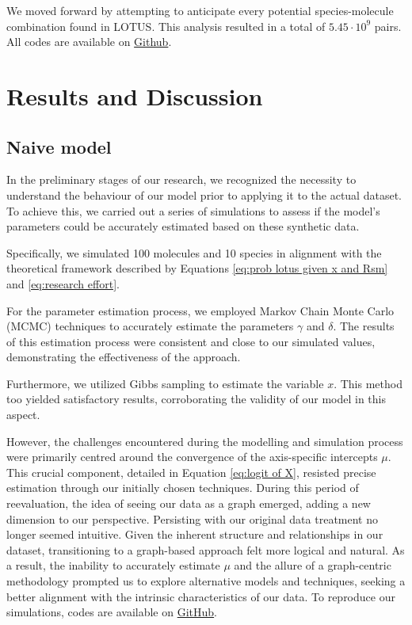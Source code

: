 \documentclass[
11pt, %
oneside, %
english, %
singlespacing, %
headsepline, %
chapterinoneline, %
]{MastersDoctoralThesis} %
\begin{document}
We moved forward by attempting to anticipate every potential species-molecule combination found in LOTUS. This analysis resulted in a total of $5.45 \cdot 10^9$ pairs. All codes are available on \href{https://github.com/anticipated-lotus/GNN}{Github}.


\chapter{Results and Discussion}
\section{Naive model}
In the preliminary stages of our research, we recognized the necessity to understand the behaviour of our model prior to applying it to the actual dataset. To achieve this, we carried out a series of simulations to assess if the model's parameters could be accurately estimated based on these synthetic data.

Specifically, we simulated 100 molecules and 10 species in alignment with the theoretical framework described by Equations \ref{eq:prob lotus given x and Rsm} and \ref{eq:research effort}.

For the parameter estimation process, we employed Markov Chain Monte Carlo (MCMC) techniques to accurately estimate the parameters $\gamma$ and $\delta$. The results of this estimation process were consistent and close to our simulated values, demonstrating the effectiveness of the approach.

Furthermore, we utilized Gibbs sampling to estimate the variable $x$. This method too yielded satisfactory results, corroborating the validity of our model in this aspect.

However, the challenges encountered during the modelling and simulation process were primarily centred around the convergence of the axis-specific intercepts $\mu$. This crucial component, detailed in Equation \ref{eq:logit of X}, resisted precise estimation through our initially chosen techniques. During this period of reevaluation, the idea of seeing our data as a graph emerged, adding a new dimension to our perspective. Persisting with our original data treatment no longer seemed intuitive. Given the inherent structure and relationships in our dataset, transitioning to a graph-based approach felt more logical and natural. As a result, the inability to accurately estimate $\mu$ and the allure of a graph-centric methodology prompted us to explore alternative models and techniques, seeking a better alignment with the intrinsic characteristics of our data. To reproduce our simulations, codes are available on \href{https://github.com/commons-research/anticipated-lotus}{GitHub}.
\end{document}
